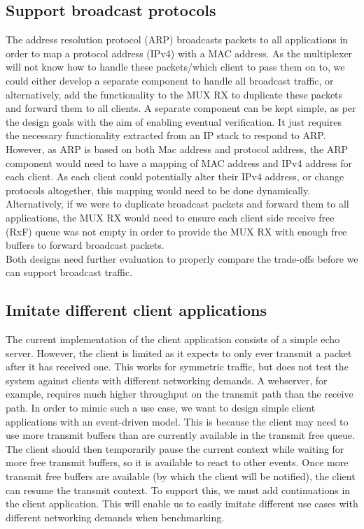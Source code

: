 \subsection{Support broadcast protocols}\label{s:arp}
The address resolution protocol (ARP) broadcasts packets to all applications in order to map a protocol
address (IPv4) with a MAC address. As the multiplexer will not know how to handle these packets/which client
to pass them on to, we could either develop a separate component to handle all broadcast traffic, or
alternatively, add the functionality to the MUX RX to duplicate these packets and forward them to all clients.
A separate component can be kept simple, as per the design goals with the aim of enabling eventual verification. It just
requires the necessary functionality extracted from an IP stack to respond to ARP. However, as ARP is based on both 
Mac address and protocol address, the ARP component would need to have a mapping of MAC address and
IPv4 address for each client. As each client could potentially alter
their IPv4 address, or change protocols altogether, this mapping would need to be done dynamically.\\ 
Alternatively, if we were to duplicate broadcast packets and forward them to all applications, the MUX RX would need to ensure
each client side receive free (RxF) queue was not empty in order to provide the MUX RX with enough free buffers to forward broadcast
packets. \\
Both designs need further evaluation to properly compare the trade-offs before we can support broadcast traffic.

\subsection{Imitate different client applications}\label{s:client}
The current implementation of the client application consists of a simple echo server. However, the client 
is limited as it expects to only ever transmit a packet after it has received one. This works for symmetric 
traffic, but does not test the system against clients with different networking demands. A webserver, for example, 
requires much higher throughput on the transmit path than the receive path. In order to mimic such a use case,
we want to design simple client applications with an event-driven model. This is because the client may need to
use more transmit buffers than are currently available in the transmit free queue. The client should then temporarily 
pause the current context while waiting for more free transmit buffers, so it is available to react to other events. 
Once more transmit free buffers are available (by which the client will be notified), the client can resume the transmit context. 
To support this, we must add continuations in the client application. This will enable us to easily imitate
different use cases with different networking demands when benchmarking.


